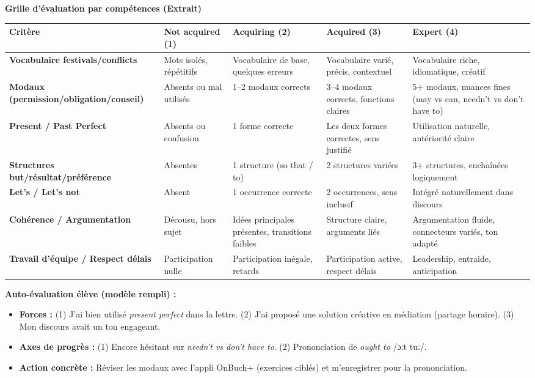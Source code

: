 \documentclass[11pt]{article}
\begin{document}
\begin{corrige}
\textbf{Grille d'évaluation par compétences (Extrait)}

\begin{center}
\begin{tabularx}{\linewidth}{|l|X|X|X|X|}\hline
\textbf{Critère} & \textbf{Not acquired (1)} & \textbf{Acquiring (2)} & \textbf{Acquired (3)} & \textbf{Expert (4)} \\ \hline
\textbf{Vocabulaire festivals/conflicts} & Mots isolés, répétitifs & Vocabulaire de base, quelques erreurs & Vocabulaire varié, précis, contextuel & Vocabulaire riche, idiomatique, créatif \\ \hline
\textbf{Modaux (permission/obligation/conseil)} & Absents ou mal utilisés & 1--2 modaux corrects & 3--4 modaux corrects, fonctions claires & 5+ modaux, nuances fines (may vs can, needn't vs don't have to) \\ \hline
\textbf{Present / Past Perfect} & Absents ou confusion & 1 forme correcte & Les deux formes correctes, sens justifié & Utilisation naturelle, antériorité claire \\ \hline
\textbf{Structures but/résultat/préférence} & Absentes & 1 structure (so that / to) & 2 structures variées & 3+ structures, enchaînées logiquement \\ \hline
\textbf{Let's / Let's not} & Absent & 1 occurrence correcte & 2 occurrences, sens inclusif & Intégré naturellement dans discours \\ \hline
\textbf{Cohérence / Argumentation} & Décousu, hors sujet & Idées principales présentes, transitions faibles & Structure claire, arguments liés & Argumentation fluide, connecteurs variés, ton adapté \\ \hline
\textbf{Travail d'équipe / Respect délais} & Participation nulle & Participation inégale, retards & Participation active, respect délais & Leadership, entraide, anticipation \\ \hline
\end{tabularx}
\end{center}

\textbf{Auto-évaluation élève (modèle rempli) :}
\begin{itemize}
    \item \textbf{Forces :} (1) J'ai bien utilisé \emph{present perfect} dans la lettre. (2) J'ai proposé une solution créative en médiation (partage horaire). (3) Mon discours avait un ton engageant.
    \item \textbf{Axes de progrès :} (1) Encore hésitant sur \emph{needn't vs don't have to}. (2) Prononciation de \emph{ought to} /ɔːt tuː/.
    \item \textbf{Action concrète :} Réviser les modaux avec l'appli OnBuch+ (exercices ciblés) et m'enregistrer pour la prononciation.
\end{itemize}
\end{corrige}
\end{document}
